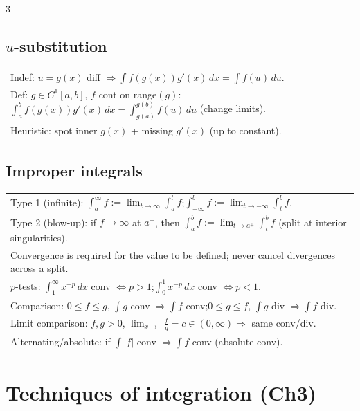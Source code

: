 \documentclass[10pt]{article}
\newcommand{\dx}{\,dx}
\begin{document}
\begin{multicols}{3}
\subsection*{$u$-substitution}
\vspace{-1pt}
\begin{tabular}{@{}p{}@{}}
Indef: $u=g(x)$ diff $\Rightarrow\int f(g(x))g'(x)\dx=\int f(u)\,du$.\\
Def: $g\in C^1[a,b]$, $f$ cont on range$(g)$:\ $\int_a^b f(g(x))g'(x)\dx=\int_{g(a)}^{g(b)} f(u)\,du$ (change limits).\\
Heuristic: spot inner $g(x)$ + missing $g'(x)$ (up to constant).\\
\end{tabular}

\subsection*{Improper integrals}
\vspace{-1pt}
\begin{tabular}{@{}p{}@{}}
Type 1 (infinite): $\int_a^{\infty} f:=\lim_{t\to\infty}\int_a^t f$;\quad $\int_{-\infty}^b f:=\lim_{t\to-\infty}\int_t^b f$.\\
Type 2 (blow-up): if $f\to\infty$ at $a^+$, then $\int_a^b f:=\lim_{t\to a^+}\int_t^b f$ (split at interior singularities).\\
Convergence is required for the value to be defined; never cancel divergences across a split.\\
$p$-tests: $\int_1^{\infty} x^{-p}\dx$ conv $\Leftrightarrow p>1$;\quad $\int_0^1 x^{-p}\dx$ conv $\Leftrightarrow p<1$.\\
Comparison: $0\le f\le g$, $\int g$ conv $\Rightarrow\int f$ conv;\quad $0\le g\le f$, $\int g$ div $\Rightarrow\int f$ div.\\
Limit comparison: $f,g>0$, $\lim_{x\to\cdot} \frac{f}{g}=c\in(0,\infty)\Rightarrow$ same conv/div.\\
Alternating/absolute: if $\int |f|$ conv $\Rightarrow \int f$ conv (absolute conv).\\
\end{tabular}

\section*{Techniques of integration (Ch3)}


\end{multicols}
\end{document}
